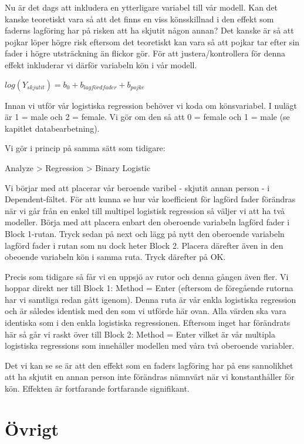 \documentclass[
]{book}
\begin{document}
Nu är det dags att inkludera en ytterligare variabel till vår modell. Kan det kanske teoretiskt vara så att det finns en viss könsskillnad i den effekt som faderns lagföring har på risken att ha skjutit någon annan? Det kanske är så att pojkar löper högre risk eftersom det teoretiskt kan vara så att pojkar tar efter sin fader i högre utsträckning än flickor gör. För att justera/kontrollera för denna effekt inkluderar vi därför variabeln kön i vår modell.

\(log(Y_{skjutit}) = b_0 + b_{lagfördfader} + b_{pojke}\)

Innan vi utför vår logistiska regression behöver vi koda om könsvariabel. I nulägt är 1 = male och 2 = female. Vi gör om den så att 0 = female och 1 = male (se kapitlet databearbetning).

Vi gör i princip på samma sätt som tidigare:

Analyze \textgreater{} Regression \textgreater{} Binary Logistic

Vi börjar med att placerar vår beroende varibel - skjutit annan person - i Dependent-fältet. För att kunna se hur vår koefficient för lagförd fader förändras när vi går från en enkel till multipel logistisk regression så väljer vi att ha två modeller. Börja med att placera enbart den oberoende variabeln lagförd fader i Block 1-rutan. Tryck sedan på next och lägg på nytt den oberoende variabeln lagförd fader i rutan som nu dock heter Block 2. Placera därefter även in den obeoende variabeln kön i samma ruta. Tryck därefter på OK.

Precis som tidigare så får vi en uppsjö av rutor och denna gången även fler. Vi hoppar direkt ner till Block 1: Method = Enter (eftersom de föregående rutorna har vi samtliga redan gått igenom). Denna ruta är vår enkla logistiska regression och är således identisk med den som vi utförde här ovan. Alla värden ska vara identiska som i den enkla logistiska regressionen. Eftersom inget har förändrats här så går vi raskt över till Block 2: Method = Enter vilket är vår multipla logistiska regressions som innehåller modellen med våra två oberoende variabler.

Det vi kan se se är att den effekt som en faders lagföring har på ens sannolikhet att ha skjutit en annan person inte förändras nämnvärt när vi konstanthåller för kön. Effekten är fortfarande fortfarande signifikant.

\hypertarget{part-uxf6vrigt}{%
\part*{Övrigt}\label{part-uxf6vrigt}}
\end{document}
